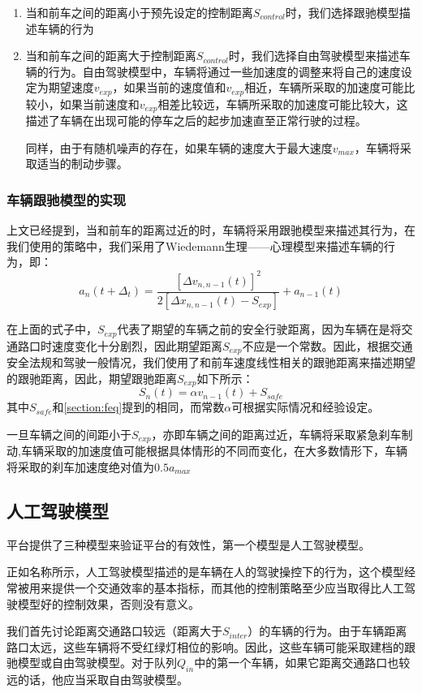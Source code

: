 \documentclass[a4paper,UTF8]{paper}
\begin{document}
\begin{enumerate}
\item 当和前车之间的距离小于预先设定的控制距离$S_{control}$时，我们选择跟驰模型描述车辆的行为

\item 当和前车之间的距离大于控制距离$S_{control}$时，我们选择自由驾驶模型来描述车辆的行为。自由驾驶模型中，车辆将通过一些加速度的调整来将自己的速度设定为期望速度$v_{exp}$，如果当前的速度值和$v_{exp}$相近，车辆所采取的加速度可能比较小，如果当前速度和$v_{exp}$相差比较远，车辆所采取的加速度可能比较大，这描述了车辆在出现可能的停车之后的起步加速直至正常行驶的过程。

同样，由于有随机噪声的存在，如果车辆的速度大于最大速度$v_{max}$，车辆将采取适当的制动步骤。
\end{enumerate}

\subsubsection{车辆跟驰模型的实现}
\label{cf}
上文已经提到，当和前车的距离过近的时，车辆将采用跟驰模型来描述其行为，在我们使用的策略中，我们采用了Wiedemann生理——心理模型来描述车辆的行为，即：
$$a_n(t+\Delta_t)=\frac{[\Delta v_{n,n-1}(t)]^2}{2[\Delta x_{n,n-1}(t)-S_{exp}]}+a_{n-1}(t)$$

在上面的式子中，$S_{exp}$代表了期望的车辆之前的安全行驶距离，因为车辆在是将交通路口时速度变化十分剧烈，因此期望距离$S_{exp}$不应是一个常数。因此，根据交通安全法规和驾驶一般情况，我们使用了和前车速度线性相关的跟驰距离来描述期望的跟驰距离，因此，期望跟驰距离$S_{exp}$如下所示：
$$S_n(t)=\alpha v_{n-1}(t)+S_{safe}$$
其中$S_{safe}$和\ref{section:feq}提到的相同，而常数$\alpha$可根据实际情况和经验设定。

一旦车辆之间的间距小于$S_{exp}$，亦即车辆之间的距离过近，车辆将采取紧急刹车制动,车辆采取的加速度值可能根据具体情形的不同而变化，在大多数情形下，车辆将采取的刹车加速度绝对值为$0.5a_{max}$

\subsection{人工驾驶模型}
\label{section:man}
平台提供了三种模型来验证平台的有效性，第一个模型是人工驾驶模型。

正如名称所示，人工驾驶模型描述的是车辆在人的驾驶操控下的行为，这个模型经常被用来提供一个交通效率的基本指标，而其他的控制策略至少应当取得比人工驾驶模型好的控制效果，否则没有意义。

我们首先讨论距离交通路口较远（距离大于$S_{inter}$）的车辆的行为。由于车辆距离路口太远，这些车辆将不受红绿灯相位的影响。因此，这些车辆可能采取建档的跟驰模型或自由驾驶模型。对于队列$Q_{in}$中的第一个车辆，如果它距离交通路口也较远的话，他应当采取自由驾驶模型。
\end{document}
